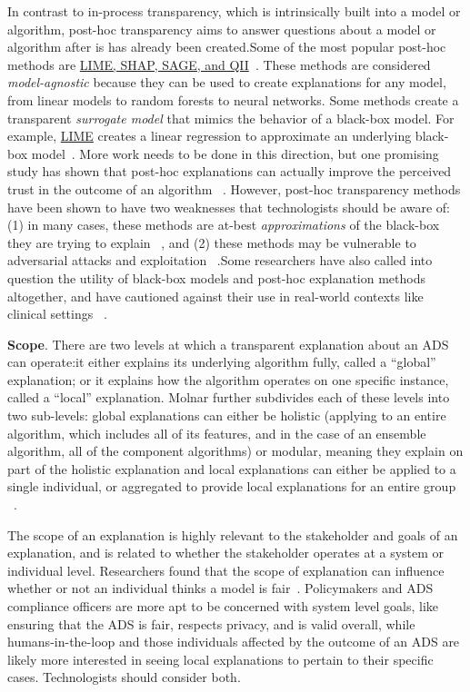 \documentclass[sigconf, nonacm]{acmart}
\begin{document}
In contrast to in-process transparency, which is intrinsically built into a model or algorithm, post-hoc transparency aims to answer questions about a model or algorithm after is has already been created.Some of the most popular post-hoc methods are \underline{LIME, SHAP, SAGE, and QII}~\cite{DBLP:conf/nips/LundbergL17, ribeiro2016should, datta2016algorithmic, DBLP:journals/corr/abs-2004-00668}. These methods are considered \emph{model-agnostic} because they can be used to create explanations for any model, from linear models to random forests to neural networks. Some methods create a transparent \emph{surrogate model} that mimics the behavior of a black-box model. For example, \underline{LIME} creates a linear regression to approximate an underlying black-box model~\cite{DBLP:conf/nips/LundbergL17}. More work needs to be done in this direction, but one promising study has shown that post-hoc explanations can actually improve the perceived trust in the outcome of an algorithm ~\cite{DBLP:conf/softcomp/BekriKH19}.
However, post-hoc transparency methods have been shown to have two weaknesses that technologists should be aware of: (1) in many cases, these methods are at-best \emph{approximations} of the black-box they are trying to explain ~\cite{zhang2019should}, and (2) these methods may be vulnerable to adversarial attacks and exploitation ~\cite{DBLP:conf/aies/SlackHJSL20}.Some researchers have also called into question the utility of black-box models and post-hoc explanation methods altogether, and have cautioned against their use in real-world contexts like clinical settings ~\cite{rudin2019stop}.

\textbf{Scope}\label{subsec:scope}. There are two levels at which a transparent explanation about an ADS can operate:it either explains its underlying algorithm fully, called a ``global'' explanation; or it explains how the algorithm operates on one specific instance, called a ``local'' explanation. Molnar further subdivides each of these levels into two sub-levels: global explanations can either be holistic (applying to an entire algorithm, which includes all of its features, and in the case of an ensemble algorithm, all of the component algorithms) or modular, meaning they explain on part of the holistic explanation and local explanations can either be applied to a single individual, or aggregated to provide local explanations for an entire group ~\cite{molnar2019}.

The scope of an explanation is highly relevant to the stakeholder and goals of an explanation, and is related to whether the stakeholder operates at a system or individual level. Researchers found that the scope of explanation can influence whether or not an individual thinks a model is fair~\cite{DBLP:journals/corr/abs-2101-09429,DBLP:conf/chi/LiaoGM20}. Policymakers and ADS compliance officers are more apt to be concerned with system level goals, like ensuring that the ADS is fair, respects privacy, and is valid overall, while humans-in-the-loop and those individuals affected by the outcome of an ADS are likely more interested in seeing local explanations to pertain to their specific cases. Technologists should consider both.
\end{document}
